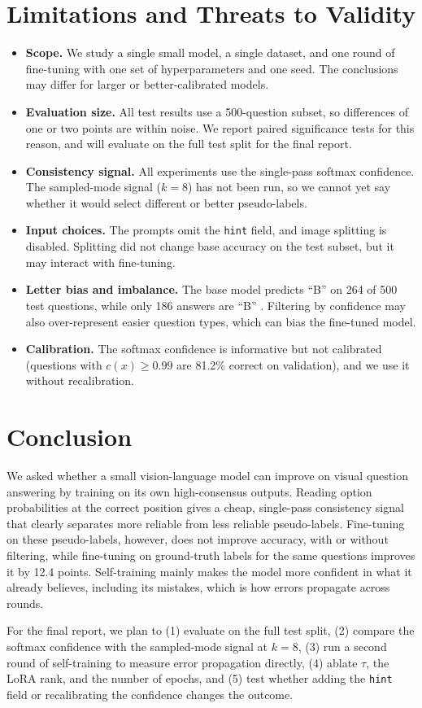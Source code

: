 \documentclass{article}
\begin{document}
\section{Limitations and Threats to Validity}
\begin{itemize}[itemsep=1pt,topsep=2pt]
  \item \textbf{Scope.} We study a single small model, a single dataset, and one round of fine-tuning with one set of hyperparameters and one seed. The conclusions may differ for larger or better-calibrated models.
  \item \textbf{Evaluation size.} All test results use a 500-question subset, so differences of one or two points are within noise. We report paired significance tests for this reason, and will evaluate on the full test split for the final report.
  \item \textbf{Consistency signal.} All experiments use the single-pass softmax confidence. The sampled-mode signal ($k = 8$) has not been run, so we cannot yet say whether it would select different or better pseudo-labels.
  \item \textbf{Input choices.} The prompts omit the \texttt{hint} field, and image splitting is disabled. Splitting did not change base accuracy on the test subset, but it may interact with fine-tuning.
  \item \textbf{Letter bias and imbalance.} The base model predicts ``B'' on 264 of 500 test questions, while only 186 answers are ``B'' \citep{zheng2024selectionbias}. Filtering by confidence may also over-represent easier question types, which can bias the fine-tuned model.
  \item \textbf{Calibration.} The softmax confidence is informative but not calibrated (questions with $c(x) \geq 0.99$ are 81.2\% correct on validation), and we use it without recalibration.
\end{itemize}

\section{Conclusion}
We asked whether a small vision-language model can improve on visual question answering by training on its own high-consensus outputs. Reading option probabilities at the correct position gives a cheap, single-pass consistency signal that clearly separates more reliable from less reliable pseudo-labels. Fine-tuning on these pseudo-labels, however, does not improve accuracy, with or without filtering, while fine-tuning on ground-truth labels for the same questions improves it by 12.4 points. Self-training mainly makes the model more confident in what it already believes, including its mistakes, which is how errors propagate across rounds.

For the final report, we plan to (1) evaluate on the full test split, (2) compare the softmax confidence with the sampled-mode signal at $k = 8$, (3) run a second round of self-training to measure error propagation directly, (4) ablate $\tau$, the LoRA rank, and the number of epochs, and (5) test whether adding the \texttt{hint} field or recalibrating the confidence changes the outcome.



\end{document}
